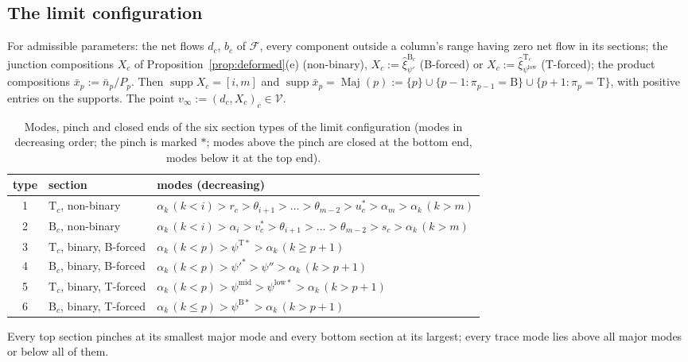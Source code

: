 \documentclass[11pt,a4paper]{report}
\newcommand{\cV}{\mathcal V}
\newcommand{\cL}{\mathcal L}
\newcommand{\cF}{\mathcal F}
\newcommand{\Ts}{\mathrm T}
\newcommand{\Bs}{\mathrm B}
\newcommand{\Maj}{\operatorname{Maj}}
\newcommand{\supp}{\operatorname{supp}}
\begin{document}
\subsection{The limit configuration}\label{sec:limitconf}

\begin{definition}[limit configuration \(\cL(\delta,\eta,\pi)\)]\label{def:L}
For admissible parameters: the net flows \(d_c\), \(b_c\) of \(\cF\), every component outside a column's range having zero
net flow in its sections; the junction compositions \(X_c\) of Proposition~\ref{prop:deformed}(e) (non-binary),
\(X_c:=\hat\xi^{\Bs_c}_{\psi'}\) (B-forced) or \(X_c:=\hat\xi^{\Ts_c}_{\psi^{\mathrm{low}}}\) (T-forced); the product compositions
\(\bar x_p:=\bar n_p/P_p\). Then \(\supp X_c=[i,m]\) and \(\supp\bar x_p=\Maj(p):=\{p\}\cup\{p-1:\pi_{p-1}=\Bs\}\cup\{p+1:\pi_p=\Ts\}\),
with positive entries on the supports. The point \(v_\infty:=(d_c,X_c)_c\in\cV\).
\end{definition}

\begin{table}[t]
\centering\footnotesize\setlength{\tabcolsep}{4pt}
\caption{Modes, pinch and closed ends of the six section types of the limit configuration (modes in decreasing order;
the pinch is marked \(*\); modes above the pinch are closed at the bottom end, modes below it at the top end).}\label{tab:types}
\begin{tabular}{@{}cll@{}}
\toprule
type & section & modes (decreasing)\\
\midrule
1 & \(\Ts_c\), non-binary & \(\alpha_k\,(k<i)>r_c>\theta_{i+1}>\dots>\theta_{m-2}>u_c^*>\alpha_m>\alpha_k\,(k>m)\)\\
2 & \(\Bs_c\), non-binary & \(\alpha_k\,(k<i)>\alpha_i>v_c^*>\theta_{i+1}>\dots>\theta_{m-2}>s_c>\alpha_k\,(k>m)\)\\
3 & \(\Ts_c\), binary, B-forced & \(\alpha_k\,(k<p)>\psi^{\Ts*}>\alpha_k\,(k\ge p+1)\)\\
4 & \(\Bs_c\), binary, B-forced & \(\alpha_k\,(k<p)>\psi'^*>\psi''>\alpha_k\,(k>p+1)\)\\
5 & \(\Ts_c\), binary, T-forced & \(\alpha_k\,(k<p)>\psi^{\mathrm{mid}}>\psi^{\mathrm{low}*}>\alpha_k\,(k>p+1)\)\\
6 & \(\Bs_c\), binary, T-forced & \(\alpha_k\,(k\le p)>\psi^{\Bs*}>\alpha_k\,(k>p+1)\)\\
\bottomrule
\end{tabular}
\end{table}

Every top section pinches at its smallest major mode and every bottom section at its largest; every trace mode lies
above all major modes or below all of them.
\end{document}
